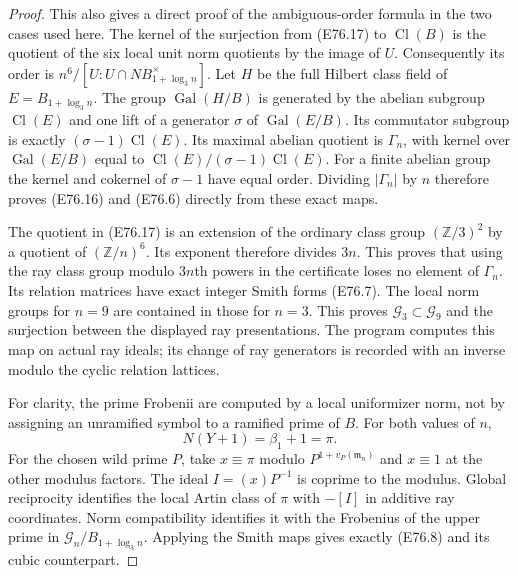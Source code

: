 \begin{proof}
This also gives a direct proof of the ambiguous-order
formula in the two cases used here. The kernel of the
surjection from (E76.17) to $\operatorname{Cl}(B)$ is
the quotient of the six local unit norm quotients by
the image of $U$. Consequently its order is
$n^6/[U:U\cap N B_{1+\log_3n}^{\times}]$.
Let $H$ be the full Hilbert class field of
$E=B_{1+\log_3n}$. The group
$\operatorname{Gal}(H/B)$ is generated by the abelian
subgroup $\operatorname{Cl}(E)$ and one lift of a
generator $\sigma$ of $\operatorname{Gal}(E/B)$.
Its commutator subgroup is exactly
$(\sigma-1)\operatorname{Cl}(E)$. Its maximal
abelian quotient is $\Gamma_n$, with kernel over
$\operatorname{Gal}(E/B)$ equal to
$\operatorname{Cl}(E)/(\sigma-1)\operatorname{Cl}(E)$.
For a finite abelian group the kernel and cokernel
of $\sigma-1$ have equal order. Dividing
$|\Gamma_n|$ by $n$ therefore proves (E76.16)
and (E76.6) directly from these exact maps.

The quotient in (E76.17) is an extension of the
ordinary class group $(\mathbb Z/3)^2$ by a
quotient of $(\mathbb Z/n)^6$. Its exponent
therefore divides $3n$. This proves that using
the ray class group modulo $3n$th powers in
the certificate loses no element of $\Gamma_n$.
Its relation matrices have exact integer Smith
forms (E76.7). The local norm groups for $n=9$
are contained in those for $n=3$. This proves
$\mathcal G_3\subset\mathcal G_9$ and the
surjection between the displayed ray presentations.
The program computes this map on actual ray ideals;
its change of ray generators is recorded with an
inverse modulo the cyclic relation lattices.

For clarity, the prime Frobenii are computed by
a local uniformizer norm, not by assigning an
unramified symbol to a ramified prime of $B$.
For both values of $n$,
\[
          N(Y+1)=\beta_1+1=\pi.
 \tag{E76.18}
\]
For the chosen wild prime $P$, take $x\equiv\pi$
modulo $P^{1+v_P(\mathfrak m_n)}$ and
$x\equiv1$ at the other modulus factors.
The ideal $I=(x)P^{-1}$ is coprime to the modulus.
Global reciprocity identifies the local Artin
class of $\pi$ with $-[I]$ in additive ray
coordinates. Norm compatibility identifies it
with the Frobenius of the upper prime in
$\mathcal G_n/B_{1+\log_3n}$. Applying the Smith
maps gives exactly (E76.8) and its cubic counterpart.


\end{proof}
